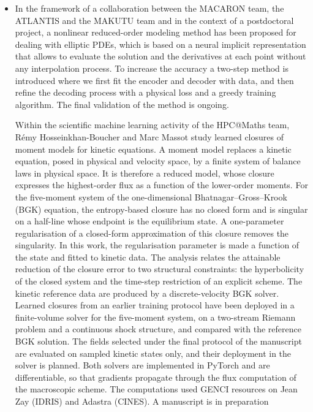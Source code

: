 \begin{itemize}
\item[T2.3] In  the framework of  a collaboration between  the MACARON
  team,  the ATLANTIS  and the  MAKUTU team  and in  the context  of a
  postdoctoral project, a nonlinear  reduced-order modeling method has
  been proposed  for dealing with elliptic  PDEs, which is based  on a
  neural implicit representation that  allows to evaluate the solution
  and the derivatives at each point without any interpolation process.
  To increase  the accuracy a  two-step method is introduced  where we
  first fit  the encoder and  decoder with  data, and then  refine the
  decoding  process  with  a  physical  loss  and  a  greedy  training
  algorithm. The final validation of the method is ongoing.

  Within the scientific machine learning activity of the HPC@Maths
  team, Rémy Hos\-sein\-khan-Bou\-cher and Marc Massot study learned
  closures of moment models for kinetic equations. A moment
  model replaces a kinetic equation, posed in physical and velocity
  space, by a finite system of balance laws in physical space. It is
  therefore a reduced model, whose closure expresses the highest-order
  flux as a function of the lower-order moments. For the five-moment
  system of the one-dimensional Bhatnagar--Gross--Krook (BGK) equation,
  the entropy-based closure has no closed form and is singular on a
  half-line whose endpoint is the equilibrium state. A one-parameter
  regularisation of a closed-form approximation of this closure removes
  the singularity. In this work, the regularisation parameter is made a
  function of the state and fitted to kinetic data. The analysis relates
  the attainable reduction of the closure error to two structural
  constraints: the hyperbolicity of the closed system and the time-step
  restriction of an explicit scheme. The kinetic reference data are
  produced by a discrete-velocity BGK solver. Learned closures from an
  earlier training protocol have been deployed in a finite-volume solver
  for the five-moment system, on a two-stream Riemann problem and a
  continuous shock structure, and compared with the reference BGK
  solution. The fields selected under the final protocol of the
  manuscript are evaluated on sampled kinetic states only, and their
  deployment in the solver is planned. Both
  solvers are implemented in PyTorch and are differentiable, so that
  gradients propagate through the flux computation of the macroscopic
  scheme. The computations used GENCI resources on Jean Zay (IDRIS) and
  Adastra (CINES). A manuscript is in preparation

\end{itemize}

